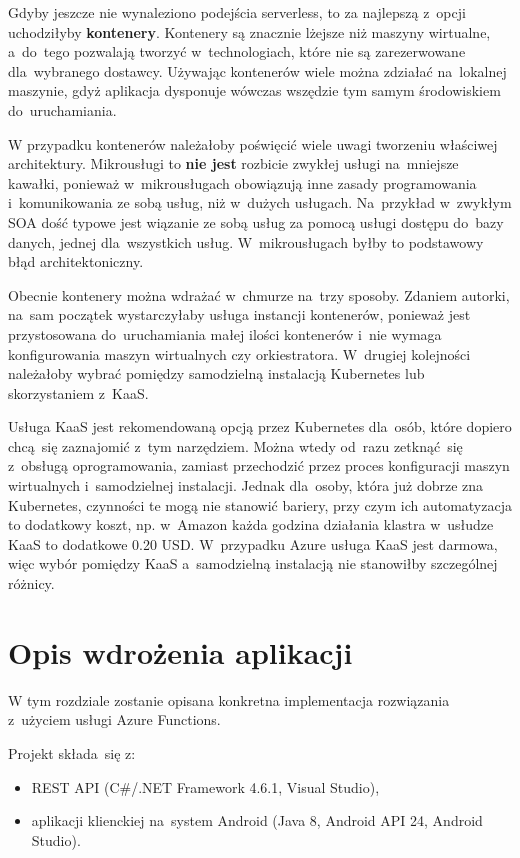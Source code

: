 \documentclass[12pt,a4paper,twoside,titlepage,openright]{book}
\begin{document}
Gdyby jeszcze nie wynaleziono podejścia serverless, to za najlepszą z~opcji uchodziłyby \textbf{kontenery}. Kontenery są znacznie lżejsze niż maszyny wirtualne, a~do~tego pozwalają tworzyć w~technologiach, które nie są zarezerwowane dla~wybranego dostawcy. Używając kontenerów wiele można zdziałać na~lokalnej maszynie, gdyż aplikacja dysponuje wówczas wszędzie tym samym środowiskiem do~uruchamiania. 

W przypadku kontenerów należałoby poświęcić wiele uwagi tworzeniu właściwej architektury. Mikrousługi to \textbf{nie jest} rozbicie zwykłej usługi na~mniejsze kawałki, ponieważ w~mikrousługach obowiązują inne zasady programowania i~komunikowania ze sobą usług, niż w~dużych usługach. Na~przykład w~zwykłym SOA dość typowe jest wiązanie ze sobą usług za pomocą usługi dostępu do~bazy danych, jednej dla~wszystkich usług. W~mikrousługach byłby to podstawowy błąd architektoniczny. 

Obecnie kontenery można wdrażać w~chmurze na~trzy sposoby. Zdaniem autorki, na~sam początek wystarczyłaby usługa instancji kontenerów, ponieważ jest przystosowana do~uruchamiania małej ilości kontenerów i~nie wymaga konfigurowania maszyn wirtualnych czy orkiestratora. W~drugiej kolejności należałoby wybrać pomiędzy samodzielną instalacją Kubernetes lub skorzystaniem z~KaaS. 

Usługa KaaS jest rekomendowaną opcją przez Kubernetes dla~osób, które dopiero chcą~się zaznajomić z~tym narzędziem. Można wtedy od~razu zetknąć~się z~obsługą oprogramowania, zamiast przechodzić przez proces konfiguracji maszyn wirtualnych i~samodzielnej instalacji. Jednak dla~osoby, która już dobrze zna Kubernetes, czynności te mogą nie stanowić bariery, przy czym ich automatyzacja to dodatkowy koszt, np. w~Amazon każda godzina działania klastra w~usłudze KaaS to dodatkowe 0.20 USD. W~przypadku Azure usługa KaaS jest darmowa, więc wybór pomiędzy KaaS a~samodzielną instalacją nie stanowiłby szczególnej różnicy.



\chapter{Opis wdrożenia aplikacji}

W tym rozdziale zostanie opisana konkretna implementacja rozwiązania z~użyciem usługi Azure Functions.

Projekt składa~się z:
\begin{itemize}
\item REST API (C\#/.NET Framework 4.6.1, Visual Studio),
\item aplikacji klienckiej na~system Android (Java 8, Android API 24, Android Studio).
\end{itemize}
\end{document}
